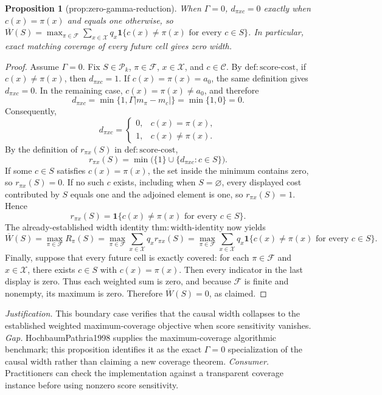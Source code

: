 \documentclass{article}
\newtheorem{proposition}{Proposition}
\begin{document}
\begin{proposition}[prop:zero-gamma-reduction]\label{prop:zero-gamma-reduction}
When \(\Gamma=0\), \(d_{\pi xc}=0\) exactly when \(c(x)=\pi(x)\) and equals one otherwise, so \(\overline W(S)=\max_{\pi\in\mathcal F}\sum_{x\in\mathcal X}q_x\mathbf1\{c(x)\neq\pi(x)\text{ for every }c\in S\}\). In particular, exact matching coverage of every future cell gives zero width.
\end{proposition}
\begin{proof}
Assume \(\Gamma=0\). Fix \(S\in\mathcal P_k\), \(\pi\in\mathcal F\), \(x\in\mathcal X\), and \(c\in\mathcal C\). By \(\mathrm{def{:}score\text{-}cost}\), if \(c(x)\neq\pi(x)\), then \(d_{\pi xc}=1\). If \(c(x)=\pi(x)=a_0\), the same definition gives \(d_{\pi xc}=0\). In the remaining case, \(c(x)=\pi(x)\neq a_0\), and therefore
\[
d_{\pi xc}=\min\{1,\Gamma|m_{\pi}-m_c|\}=\min\{1,0\}=0.
\]
Consequently,
\[
d_{\pi xc}=
\begin{cases}
0,&c(x)=\pi(x),\\
1,&c(x)\neq\pi(x).
\end{cases}
\]
By the definition of \(r_{\pi x}(S)\) in \(\mathrm{def{:}score\text{-}cost}\),
\[
r_{\pi x}(S)=\min\bigl(\{1\}\cup\{d_{\pi xc}:c\in S\}\bigr).
\]
If some \(c\in S\) satisfies \(c(x)=\pi(x)\), the set inside the minimum contains zero, so \(r_{\pi x}(S)=0\). If no such \(c\) exists, including when \(S=\varnothing\), every displayed cost contributed by \(S\) equals one and the adjoined element is one, so \(r_{\pi x}(S)=1\). Hence
\[
r_{\pi x}(S)=\mathbf 1\{c(x)\neq\pi(x)\text{ for every }c\in S\}.
\]
The already-established width identity \(\mathrm{thm{:}width\text{-}identity}\) now yields
\[
\overline W(S)
=\max_{\pi\in\mathcal F}R_{\pi}(S)
=\max_{\pi\in\mathcal F}\sum_{x\in\mathcal X}q_x r_{\pi x}(S)
=\max_{\pi\in\mathcal F}\sum_{x\in\mathcal X}q_x\mathbf 1\{c(x)\neq\pi(x)\text{ for every }c\in S\}.
\]
Finally, suppose that every future cell is exactly covered: for each \(\pi\in\mathcal F\) and \(x\in\mathcal X\), there exists \(c\in S\) with \(c(x)=\pi(x)\). Then every indicator in the last display is zero. Thus each weighted sum is zero, and because \(\mathcal F\) is finite and nonempty, its maximum is zero. Therefore \(\overline W(S)=0\), as claimed.
\end{proof}
\par\smallskip\noindent \textit{Justification.} This boundary case verifies that the causal width collapses to the established weighted maximum-coverage objective when score sensitivity vanishes. \textit{Gap.} HochbaumPathria1998 supplies the maximum-coverage algorithmic benchmark; this proposition identifies it as the exact \(\Gamma=0\) specialization of the causal width rather than claiming a new coverage theorem. \textit{Consumer.} Practitioners can check the implementation against a transparent coverage instance before using nonzero score sensitivity.
\end{document}
